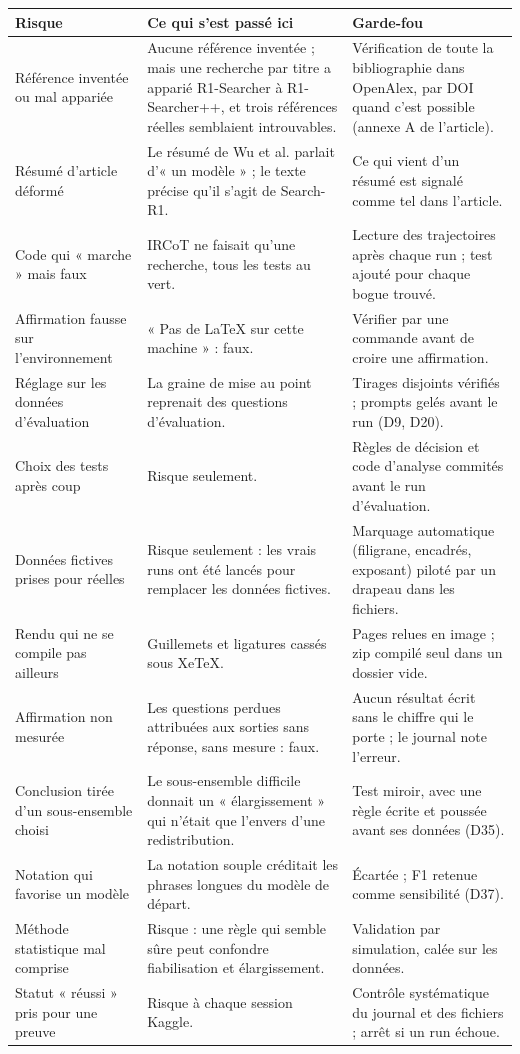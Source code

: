 \documentclass[10pt,a4paper]{article}
\begin{document}
\small
\begin{longtable}{@{}P{3cm}P{6.6cm}P{6cm}@{}}
\toprule
Risque & Ce qui s'est passé ici & Garde-fou\\
\midrule\endhead
Référence inventée ou mal appariée & Aucune référence inventée ; mais une recherche par titre a apparié R1-Searcher à R1-Searcher++, et trois références réelles semblaient introuvables. & Vérification de toute la bibliographie dans OpenAlex, par DOI quand c'est possible (annexe A de l'article).\\
Résumé d'article déformé & Le résumé de Wu et al. parlait d'« un modèle » ; le texte précise qu'il s'agit de Search-R1. & Ce qui vient d'un résumé est signalé comme tel dans l'article.\\
Code qui « marche » mais faux & IRCoT ne faisait qu'une recherche, tous les tests au vert. & Lecture des trajectoires après chaque run ; test ajouté pour chaque bogue trouvé.\\
Affirmation fausse sur l'environnement & « Pas de LaTeX sur cette machine » : faux. & Vérifier par une commande avant de croire une affirmation.\\
Réglage sur les données d'évaluation & La graine de mise au point reprenait des questions d'évaluation. & Tirages disjoints vérifiés ; prompts gelés avant le run (D9, D20).\\
Choix des tests après coup & Risque seulement. & Règles de décision et code d'analyse commités avant le run d'évaluation.\\
Données fictives prises pour réelles & Risque seulement : les vrais runs ont été lancés pour remplacer les données fictives. & Marquage automatique (filigrane, encadrés, exposant) piloté par un drapeau dans les fichiers.\\
Rendu qui ne se compile pas ailleurs & Guillemets et ligatures cassés sous XeTeX. & Pages relues en image ; zip compilé seul dans un dossier vide.\\
Affirmation non mesurée & Les questions perdues attribuées aux sorties sans réponse, sans mesure : faux. & Aucun résultat écrit sans le chiffre qui le porte ; le journal note l'erreur.\\
Conclusion tirée d'un sous-ensemble choisi & Le sous-ensemble difficile donnait un « élargissement » qui n'était que l'envers d'une redistribution. & Test miroir, avec une règle écrite et poussée avant ses données (D35).\\
Notation qui favorise un modèle & La notation souple créditait les phrases longues du modèle de départ. & Écartée ; F1 retenue comme sensibilité (D37).\\
Méthode statistique mal comprise & Risque : une règle qui semble sûre peut confondre fiabilisation et élargissement. & Validation par simulation, calée sur les données.\\
Statut « réussi » pris pour une preuve & Risque à chaque session Kaggle. & Contrôle systématique du journal et des fichiers ; arrêt si un run échoue.\\
\bottomrule
\end{longtable}
\normalsize
\end{document}
